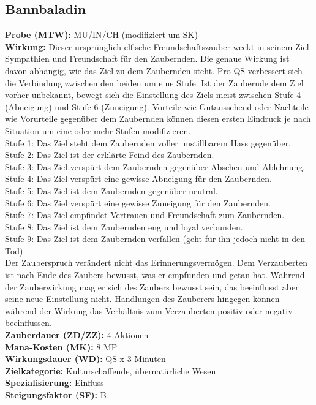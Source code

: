 \subsection{Bannbaladin}
\label{chap:bannbaladin}
\textbf{Probe (MTW):} MU/IN/CH (modifiziert um SK) \\
\textbf{Wirkung:} Dieser ursprünglich elfische Freundschaftszauber weckt in seinem Ziel Sympathien und Freundschaft für den Zaubernden. Die genaue Wirkung ist davon abhängig, wie das Ziel zu dem Zaubernden steht. Pro QS verbessert sich die Verbindung zwischen den beiden um eine Stufe. Ist der Zaubernde dem Ziel vorher unbekannt, bewegt sich die Einstellung des Ziels meist zwischen Stufe 4 (Abneigung) und Stufe 6 (Zuneigung). Vorteile wie Gutaussehend oder Nachteile wie Vorurteile gegenüber dem Zaubernden können diesen ersten Eindruck je nach Situation um eine oder mehr Stufen modifizieren.\\
Stufe 1: Das Ziel steht dem Zaubernden voller unstillbarem Hass gegenüber.\\
Stufe 2: Das Ziel ist der erklärte Feind des Zaubernden.\\
Stufe 3: Das Ziel verspürt dem Zaubernden gegenüber Abscheu und Ablehnung.\\
Stufe 4: Das Ziel verspürt eine gewisse Abneigung für den Zaubernden.\\
Stufe 5: Das Ziel ist dem Zaubernden gegenüber neutral.\\
Stufe 6: Das Ziel verspürt eine gewisse Zuneigung für den Zaubernden.\\
Stufe 7: Das Ziel empfindet Vertrauen und Freundschaft zum Zaubernden.\\
Stufe 8: Das Ziel ist dem Zaubernden eng und loyal verbunden.\\
Stufe 9: Das Ziel ist dem Zaubernden verfallen (geht für ihn jedoch nicht in den Tod).\\
Der Zauberspruch verändert nicht das Erinnerungsvermögen. Dem Verzauberten ist nach Ende des Zaubers bewusst, was er empfunden und getan hat. Während der Zauberwirkung mag er sich des Zaubers bewusst sein, das beeinflusst aber seine neue Einstellung nicht. Handlungen des Zauberers hingegen können während der Wirkung das Verhältnis zum Verzauberten positiv oder negativ beeinflussen. \\
\textbf{Zauberdauer (ZD/ZZ):} 4 Aktionen \\
\textbf{Mana-Kosten (MK):} 8 MP \\
\textbf{Wirkungsdauer (WD):} QS x 3 Minuten \\
\textbf{Zielkategorie:} Kulturschaffende, übernatürliche Wesen \\
\textbf{Spezialisierung:} Einfluss \\
\textbf{Steigungsfaktor (SF):} B


